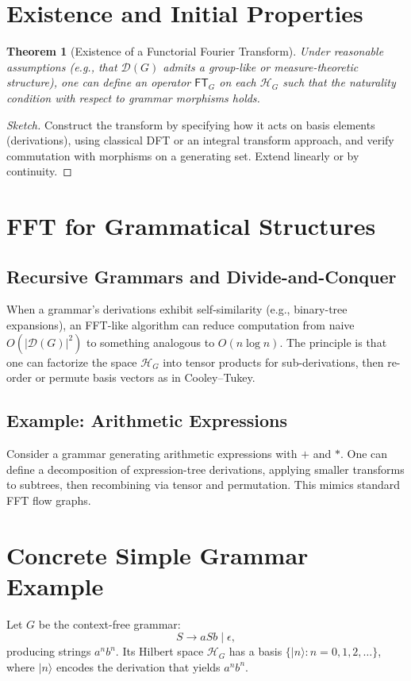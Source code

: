 \documentclass[11pt]{article}
\newtheorem{theorem}{Theorem}[section]
\begin{document}
\section{Existence and Initial Properties}
\begin{theorem}[Existence of a Functorial Fourier Transform]
Under reasonable assumptions (e.g., that \(\mathcal{D}(G)\) admits a group-like or measure-theoretic structure), one can define an operator \(\mathsf{FT}_G\) on each \(\mathcal{H}_G\) such that the naturality condition with respect to grammar morphisms holds.\end{theorem}

\begin{proof}[Sketch]
Construct the transform by specifying how it acts on basis elements (derivations), using classical DFT or an integral transform approach, and verify commutation with morphisms on a generating set. Extend linearly or by continuity.
\end{proof}

\section{FFT for Grammatical Structures}
\label{sec:fft}
\subsection{Recursive Grammars and Divide-and-Conquer}
When a grammar's derivations exhibit self-similarity (e.g., binary-tree expansions), an FFT-like algorithm can reduce computation from naive \(O(|\mathcal{D}(G)|^2)\) to something analogous to \(O(n \log n)\). The principle is that one can factorize the space \(\mathcal{H}_G\) into tensor products for sub-derivations, then re-order or permute basis vectors as in Cooley--Tukey.

\subsection{Example: Arithmetic Expressions}
Consider a grammar generating arithmetic expressions with \(+\) and \(*\). One can define a decomposition of expression-tree derivations, applying smaller transforms to subtrees, then recombining via tensor and permutation. This mimics standard FFT flow graphs.

\section{Concrete Simple Grammar Example}
\label{sec:example}
Let \( G \) be the context-free grammar:
\[
S \rightarrow a S b \mid \epsilon,
\]
producing strings \( a^n b^n \). Its Hilbert space \(\mathcal{H}_G\) has a basis \(\{|n\rangle : n = 0, 1, 2,\dots\}\), where \(|n\rangle\) encodes the derivation that yields \( a^n b^n \).
\end{document}
